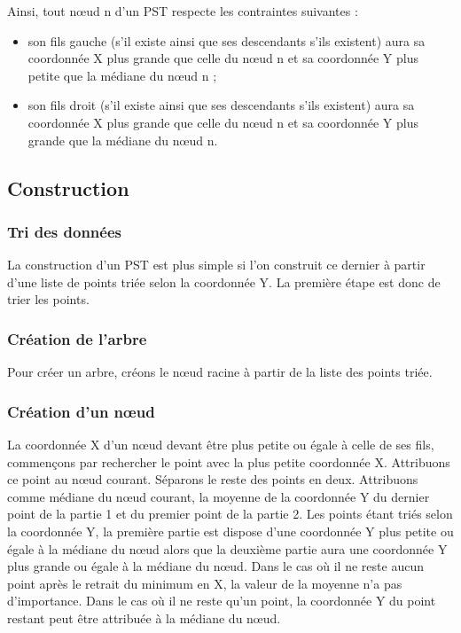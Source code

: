 \documentclass[10pt,a4paper]{article}
\begin{document}
Ainsi, tout nœud n d'un PST respecte les contraintes suivantes :
\begin{itemize}
	\item son fils gauche (s'il existe ainsi que ses descendants s'ils existent) aura sa coordonnée X plus grande que celle du nœud n et sa coordonnée Y plus petite que la médiane du nœud n ;
	\item son fils droit (s'il existe ainsi que ses descendants s'ils existent) aura sa coordonnée X plus grande que celle du nœud n et sa coordonnée Y plus grande que la médiane du nœud n.
\end{itemize}

\subsection{Construction}

\subsubsection{Tri des données}
La construction d'un PST est plus simple si l'on construit ce dernier à partir d'une liste de points triée selon la coordonnée Y. La première étape est donc de trier les points.

\subsubsection{Création de l'arbre}
Pour créer un arbre, créons le nœud racine à partir de la liste des points triée.

\subsubsection{Création d'un nœud}
La coordonnée X d'un nœud devant être plus petite ou égale à celle de ses fils, commençons par rechercher le point avec la plus petite coordonnée X. Attribuons ce point au nœud courant. Séparons le reste des points en deux. Attribuons comme médiane du nœud courant, la moyenne de la coordonnée Y du dernier point de la partie 1 et du premier point de la partie 2. Les points étant triés selon la coordonnée Y, la première partie est dispose d'une coordonnée Y plus petite ou égale à la médiane du nœud alors que la deuxième partie aura une coordonnée Y plus grande ou égale à la médiane du nœud. Dans le cas où il ne reste aucun point après le retrait du minimum en X, la valeur de la moyenne n'a pas d'importance. Dans le cas où il ne reste qu'un point, la coordonnée Y du point restant peut être attribuée à la médiane du nœud.
\end{document}

